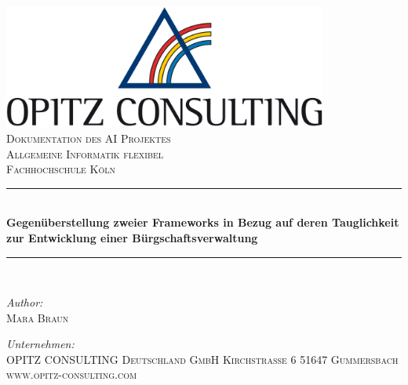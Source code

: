 \begin{titlepage}
\begin{center}

\includegraphics[width=0.80\textwidth]{img/oc-logo.jpg}\\[1cm]

\textsc{\LARGE Dokumentation des AI Projektes}\\[1.5cm]

\textsc{\Large Allgemeine Informatik flexibel}\\[0.5cm]
\textsc{\Large Fachhochschule Köln}\\[0.5cm]

\newcommand{\HRule}{\rule{\linewidth}{0.5mm}}
\HRule \\[0.4cm]
{ \huge \bfseries Gegenüberstellung zweier Frameworks in Bezug auf deren Tauglichkeit zur Entwicklung einer Bürgschaftsverwaltung}\\[0.4cm]
\HRule \\[1.5cm]

\begin{minipage}{0.3\textwidth}
\begin{flushleft} \large
\emph{Author:}\\
\textsc{Mara Braun}
\end{flushleft}
\end{minipage}
\hfill
\begin{minipage}{0.5\textwidth}
\begin{flushright} \large
\emph{Unternehmen:} \\
\textsc{OPITZ CONSULTING Deutschland GmbH
Kirchstraße 6
51647 Gummersbach
www.opitz-consulting.com}
\end{flushright}
\end{minipage}

\vfill
\end{center}
\end{titlepage}
